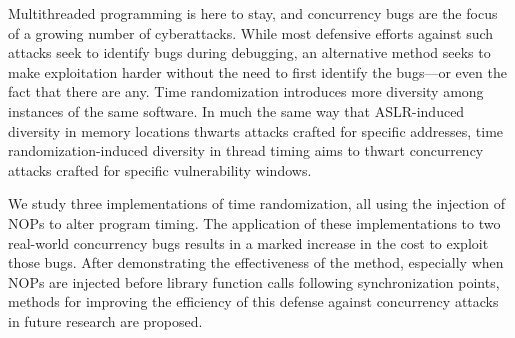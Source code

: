 Multithreaded programming is here to stay, and concurrency bugs are the focus of a growing number of cyberattacks.
While most defensive efforts against such attacks seek to identify bugs during
debugging, an alternative method seeks to make exploitation harder without the
need to first identify the bugs---or even the fact that there are any.
Time randomization introduces more diversity among instances of the same software.
In much the same way that ASLR-induced diversity in memory locations thwarts attacks crafted for specific addresses, time randomization-induced diversity in thread timing aims to thwart concurrency attacks crafted for specific vulnerability windows.

We study three implementations of time randomization, all using the injection of NOPs to alter program timing.
The application of these implementations to two real-world concurrency bugs results in a marked increase in the cost to exploit those bugs.
After demonstrating the effectiveness of the method, especially when NOPs are injected before library function calls following synchronization points, methods for improving the efficiency of this defense against concurrency attacks in future research are proposed.
